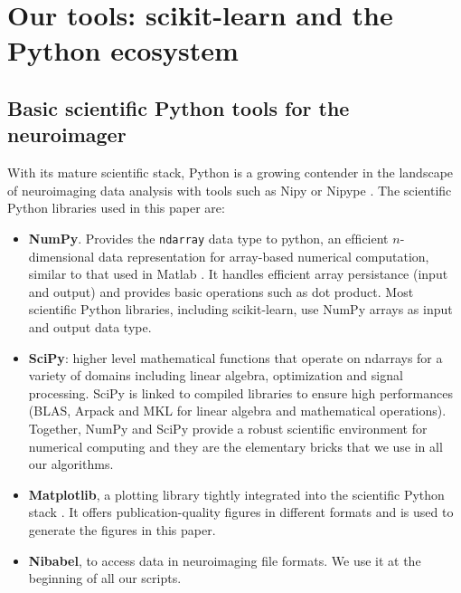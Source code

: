 \documentclass{frontiersSCNS} %
\begin{document}

\section{Our tools: scikit-learn and the Python ecosystem}

\subsection{Basic scientific Python tools for the neuroimager}

With its mature scientific stack, Python is a growing contender in the
landscape of neuroimaging data analysis with tools such as Nipy
\citep{millman2007analysis} or Nipype \citep{gorgolewski2011}.
The scientific Python libraries used in this paper are:
\begin{itemize}
    \item{\bf NumPy}. Provides the \verb!ndarray! data type to python,
        an efﬁcient $n$-dimensional data representation for
        array-based numerical computation, similar to that used in Matlab
        \citep{vanderwalt2011}. It handles efficient array persistance
        (input and output) and provides basic operations such as dot
        product. Most scientific Python libraries, including scikit-learn, 
	use NumPy arrays
        as input and output data type.

    \item{\bf SciPy}: higher level mathematical functions that operate on ndarrays for
        a variety of domains including linear algebra, optimization and signal
        processing. SciPy is linked to compiled libraries to ensure high
        performances (BLAS, Arpack and MKL for linear algebra and mathematical
        operations).
        Together, NumPy and SciPy provide a robust scientific environment
        for numerical computing and they are the elementary bricks that we use in all our
        algorithms.

    \item{\bf Matplotlib}, a plotting library tightly integrated into the
        scientific Python stack \citep{hunter2007}. It offers publication-quality figures in
        different formats and is used to generate the figures in
	this paper.

    \item{\bf Nibabel}, to access data in neuroimaging file formats.
	We use it at the beginning of all our scripts.
\end{itemize}
\end{document}
